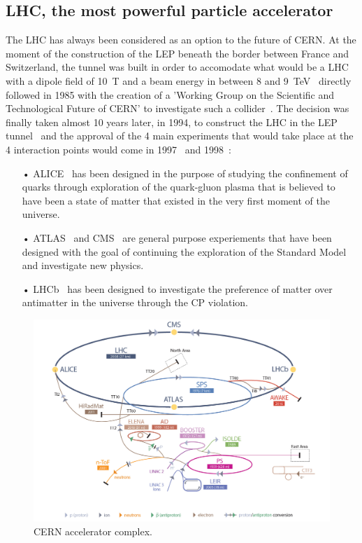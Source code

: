 	\subsection{LHC, the most powerful particle accelerator}
	\label{chapt2:ssec:LHC}
	
	The LHC has always been considered as an option to the future of CERN. At the moment of the construction of the LEP beneath the border between France and Switzerland, the tunnel was built in order to accomodate what would be a \acl{LHC} with a dipole field of \SI{10}{T} and a beam energy in between 8 and \SI{9}{TeV}~\cite{ANNUALREPORT1984} directly followed in 1985 with the creation of a 'Working Group on the Scientific and Technological Future of CERN' to investigate such a collider~\cite{ANNUALREPORT1985}. The decision was finally taken almost 10 years later, in 1994, to construct the LHC in the LEP tunnel~\cite{ANNUALREPORT1994} and the approval of the 4 main experiments that would take place at the 4 interaction points would come in 1997~\cite{ANNUALREPORT1997} and 1998~\cite{ANNUALREPORT1998}:
	
	\begin{itemize}
		\item[•] ALICE~\cite{ALICELOI} has been designed in the purpose of studying the confinement of quarks through exploration of the quark-gluon plasma that is believed to have been a state of matter that existed in the very first moment of the universe.
		\item[•] ATLAS~\cite{ATLASLOI} and CMS~\cite{CMSLOI} are general purpose experiements that have been designed with the goal of continuing the exploration of the Standard Model and investigate new physics.
		\item[•] LHCb~\cite{LHCBLOI} has been designed to investigate the preference of matter over antimatter in the universe through the CP violation.
	\end{itemize}

	\begin{figure}[H]
		\centering
		\includegraphics[width=\linewidth]{fig/chapt2/CERN_Accelerator_Complex.png}
		\caption{\label{fig:CERNComplex} CERN accelerator complex.}
	\end{figure}
	
